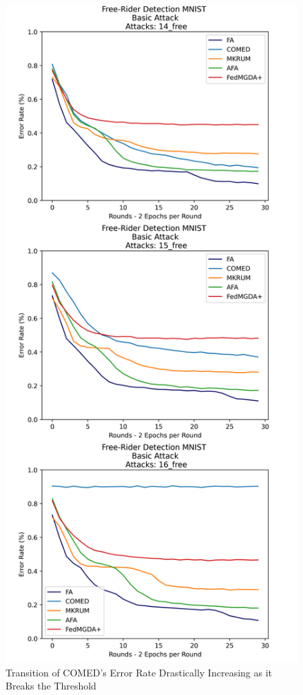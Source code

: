 \begin{figure}[htbp]
	\centering
    \includegraphics[scale=0.1]{free_riders/graphs/comed_broken.png}
	\caption{Transition of COMED's Error Rate Drastically Increasing as it Breaks the Threshold}
	\label{fig:comed_broken}
\end{figure}

